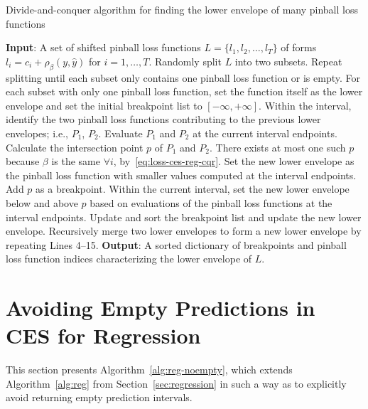 \begin{algorithm}[H]
    \caption{Divide-and-conquer algorithm for finding the lower envelope of many pinball loss functions}
    \label{alg:envelope-cqr}
    \begin{algorithmic} [1]
        \STATE \textbf{Input}: A set of shifted pinball loss functions $L = \{l_1, l_2, \dots, l_T \}$ of forms $l_i = c_i + \rho_\beta(y, \hat{y})$ for $i=1,\dots, T$.
        \STATE Randomly split $L$ into two subsets. Repeat splitting until each subset only contains one pinball loss function or is empty.
        \STATE For each subset with only one pinball loss function, set the function itself as the lower envelope and set the initial breakpoint list to $[-\infty, +\infty]$.
            \STATE Within the interval, identify the two pinball loss functions contributing to the previous lower envelopes; i.e., $P_1$, $P_2$.
            \STATE Evaluate $P_1$ and $P_2$ at the current interval endpoints.
            \STATE Calculate the intersection point $p$ of $P_1$ and $P_2$. There exists at most one such $p$ because $\beta$ is the same $\forall i$, by~\eqref{eq:loss-ces-reg-cqr}.
            \STATE Set the new lower envelope as the pinball loss function with smaller values computed at the interval endpoints.
            \ELSE \STATE Add $p$ as a breakpoint.
            \STATE Within the current interval, set the new lower envelope below and above $p$ based on evaluations of the pinball loss functions at the interval endpoints.
            \ENDIF
            \STATE Update and sort the breakpoint list and update the new lower envelope.
        \ENDFOR
        \STATE Recursively merge two lower envelopes to form a new lower envelope by repeating Lines 4--15.
        \STATE \textbf{Output}: A sorted dictionary of breakpoints and pinball loss function indices characterizing the lower envelope of $L$.
\end{algorithmic}
\end{algorithm}



\section{Avoiding Empty Predictions in CES for Regression} \label{app:reg-noempty}

This section presents Algorithm~\ref{alg:reg-noempty}, which extends Algorithm~\ref{alg:reg} from Section~\ref{sec:regression} in such a way as to explicitly avoid returning empty prediction intervals.


